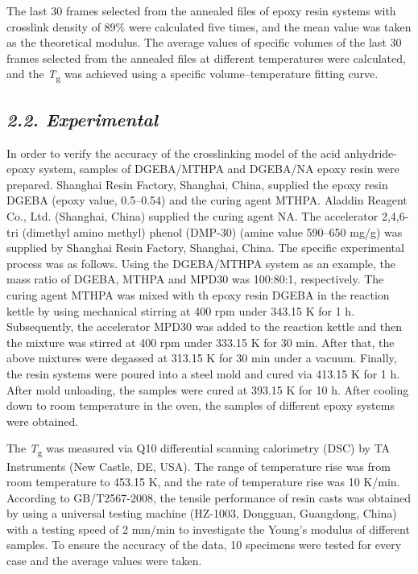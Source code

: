 \documentclass{article}
\begin{document}
The last 30 frames selected from the annealed files of epoxy resin systems with crosslink density of 89\% were calculated five times, and the mean value was taken as the theoretical modulus. The average values of specific volumes of the last 30 frames selected from the annealed files at different temperatures were calculated, and the \emph{T}\textsubscript{g} was achieved using a specific volume–temperature fitting curve.

\subsection*{\emph{2.2. Experimental}}

In order to verify the accuracy of the crosslinking model of the acid anhydride-epoxy system, samples of DGEBA/MTHPA and DGEBA/NA epoxy resin were prepared. Shanghai Resin Factory, Shanghai, China, supplied the epoxy resin DGEBA (epoxy value, 0.5–0.54) and the curing agent MTHPA. Aladdin Reagent Co., Ltd. (Shanghai, China) supplied the curing agent NA. The accelerator 2,4,6-tri (dimethyl amino methyl) phenol (DMP-30) (amine value 590–650 mg/g) was supplied by Shanghai Resin Factory, Shanghai, China. The specific experimental process was as follows. Using the DGEBA/MTHPA system as an example, the mass ratio of DGEBA, MTHPA and MPD30 was 100:80:1, respectively. The curing agent MTHPA was mixed with th epoxy resin DGEBA in the reaction kettle by using mechanical stirring at 400 rpm under 343.15 K for 1 h. Subsequently, the accelerator MPD30 was added to the reaction kettle and then the mixture was stirred at 400 rpm under 333.15 K for 30 min. After that, the above mixtures were degassed at 313.15 K for 30 min under a vacuum. Finally, the resin systems were poured into a steel mold and cured via 413.15 K for 1 h. After mold unloading, the samples were cured at 393.15 K for 10 h. After cooling down to room temperature in the oven, the samples of different epoxy systems were obtained.

The \emph{T}\textsubscript{g} was measured via Q10 differential scanning calorimetry (DSC) by TA Instruments (New Castle, DE, USA). The range of temperature rise was from room temperature to 453.15 K, and the rate of temperature rise was 10 K/min. According to GB/T2567-2008, the tensile performance of resin casts was obtained by using a universal testing machine (HZ-1003, Dongguan, Guangdong, China) with a testing speed of 2 mm/min to investigate the Young’s modulus of different samples. To ensure the accuracy of the data, 10 specimens were tested for every case and the average values were taken.
\end{document}
